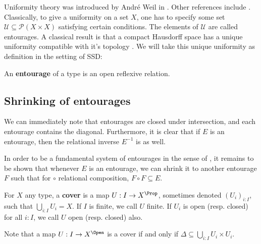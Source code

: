 Uniformity theory was introduced by Andr\'e Weil in \cite{Weil}. Other references include \cite{Tukey, BourbakiTopologyCh1To4, Howes, Isbell}. 
Classically, to give a uniformity on a set $X$, one has to specify some set $\mathcal U \subseteq \mathcal P(X\times X)$ satisfying certain conditions. The elements of $\mathcal U$ are called entourages.  
A classical result is that a compact Hausdorff space has a unique uniformity compatible with it's topology \parencite[Theorem II.4.1.1]{BourbakiTopologyCh1To4}. We will take this unique uniformity as definition in the setting of SSD:
\begin{definition}\label{DfnEntourage}
  An \textbf{entourage} of a type is an open reflexive relation. 
\end{definition}
\subsection{Shrinking of entourages}
\begin{remark}
  We can immediately note that entourages are closed under intersection, and each entourage contains the diagonal. Furthermore, it is clear that if $E$ is an entourage, then the relational inverse $E^{-1}$ is as well. 
\end{remark}
In order to be a fundamental system of entourages in the sense of \parencite[170]{BourbakiTopologyCh1To4}, it remains to be shown that whenever $E$ is an entourage, we can shrink it to another entourage $F$ such that for $\circ$ relational composition, $F\circ F \subseteq E$. 
\begin{definition}
  For $X$ any type, a \textbf{cover} is a map $U:I \to X^\Prop$, sometimes denoted $(U_i)_{i:I}$, such that $\bigcup_{i:I} U_i = X$. 
  If $I$ is finite, we call $U$ finite. If $U_i$ is open (resp. closed) for all $i:I$, we call $U$ open (resp. closed) also. 
\end{definition}
\begin{remark}
  Note that a map $U:I \to X^\Open$ is a cover if and only if $\Delta \subseteq \bigcup_{i:I} U_i \times U_i$. 
\end{remark}


